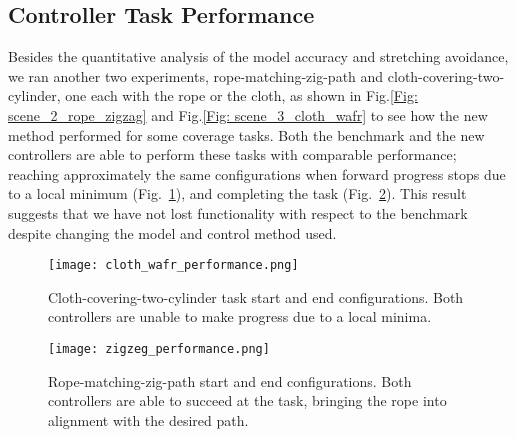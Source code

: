 




\subsection{Controller Task Performance} \label{Results:Controller Task Performance}

Besides the quantitative analysis of the model accuracy and stretching avoidance, we ran another two experiments, rope-matching-zig-path and cloth-covering-two-cylinder, one each with the rope or the cloth, as shown in Fig.\ref{Fig: scene_2_rope_zigzag} and Fig.\ref{Fig: scene_3_cloth_wafr} to see how the new method performed for some coverage tasks. Both the benchmark and the new controllers are able to perform these tasks with comparable performance; reaching approximately the same configurations when forward progress stops due to a local minimum (Fig.~\ref{Fig: cloth_wafr_performance}), and completing the task (Fig.~\ref{Fig: zigzeg_performance}). This result suggests that we have not lost functionality with respect to the benchmark despite changing the model and control method used.


\begin{figure}[ht!]
    \centering
    \texttt{[image: cloth\_wafr\_performance.png]}
    \caption{Cloth-covering-two-cylinder task start and end configurations. Both controllers are unable to make progress due to a local minima.}
    \label{Fig: cloth_wafr_performance}
\end{figure}


\begin{figure}[ht!]
    \centering
    \texttt{[image: zigzeg\_performance.png]}
    \caption{Rope-matching-zig-path start and end configurations. Both controllers are able to succeed at the task, bringing the rope into alignment with the desired path.}
    \label{Fig: zigzeg_performance}
\end{figure}



